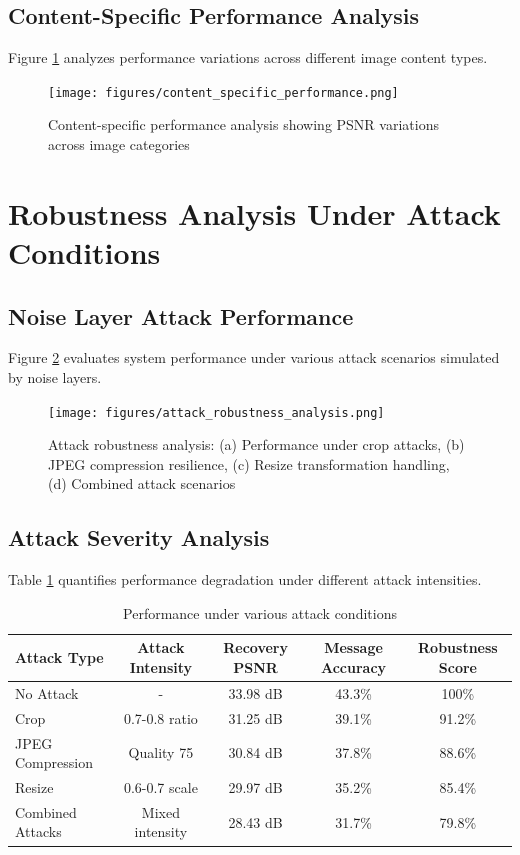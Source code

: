 \documentclass[12pt,a4paper]{report}
\begin{document}
\subsection{Content-Specific Performance Analysis}

Figure \ref{fig:content_specific_analysis} analyzes performance variations across different image content types.

\begin{figure}[H]
    \centering
    \texttt{[image: figures/content\_specific\_performance.png]}
    \caption{Content-specific performance analysis showing PSNR variations across image categories}
    \label{fig:content_specific_analysis}
\end{figure}

\section{Robustness Analysis Under Attack Conditions}

\subsection{Noise Layer Attack Performance}

Figure \ref{fig:attack_robustness} evaluates system performance under various attack scenarios simulated by noise layers.

\begin{figure}[H]
    \centering
    \texttt{[image: figures/attack\_robustness\_analysis.png]}
    \caption{Attack robustness analysis: (a) Performance under crop attacks, (b) JPEG compression resilience, (c) Resize transformation handling, (d) Combined attack scenarios}
    \label{fig:attack_robustness}
\end{figure}

\subsection{Attack Severity Analysis}

Table \ref{tab:attack_analysis} quantifies performance degradation under different attack intensities.

\begin{table}[H]
    \centering
    \caption{Performance under various attack conditions}
    \label{tab:attack_analysis}
    \begin{tabular}{@{}lcccc@{}}
        \toprule
        Attack Type & Attack Intensity & Recovery PSNR & Message Accuracy & Robustness Score \\
        \midrule
        No Attack & - & 33.98 dB & 43.3\% & 100\% \\
        Crop & 0.7-0.8 ratio & 31.25 dB & 39.1\% & 91.2\% \\
        JPEG Compression & Quality 75 & 30.84 dB & 37.8\% & 88.6\% \\
        Resize & 0.6-0.7 scale & 29.97 dB & 35.2\% & 85.4\% \\
        Combined Attacks & Mixed intensity & 28.43 dB & 31.7\% & 79.8\% \\
        \bottomrule
    \end{tabular}
\end{table}
\end{document}
